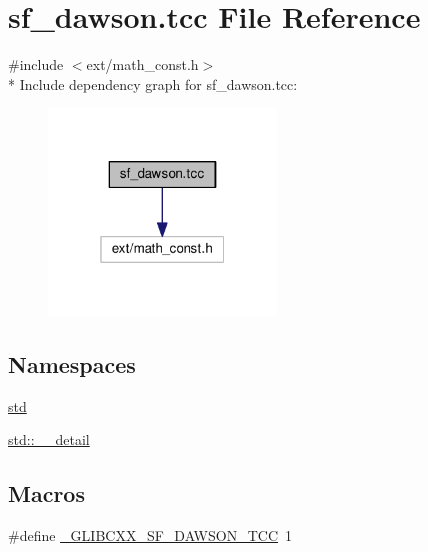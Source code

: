 \hypertarget{sf__dawson_8tcc}{}\section{sf\+\_\+dawson.\+tcc File Reference}
\label{sf__dawson_8tcc}
{\ttfamily \#include $<$ext/math\+\_\+const.\+h$>$}\\*
Include dependency graph for sf\+\_\+dawson.\+tcc\+:
\nopagebreak
\begin{figure}[H]
\begin{center}
\leavevmode
\includegraphics[width=172pt]{sf__dawson_8tcc__incl}
\end{center}
\end{figure}
\subsection*{Namespaces}
\begin{DoxyCompactItemize}
\item 
 \hyperlink{namespacestd}{std}
\item 
 \hyperlink{namespacestd_1_1____detail}{std\+::\+\_\+\+\_\+detail}
\end{DoxyCompactItemize}
\subsection*{Macros}
\begin{DoxyCompactItemize}
\item 
\#define \hyperlink{sf__dawson_8tcc_a72d0ce5cd51240da4fb2546e640923de}{\+\_\+\+G\+L\+I\+B\+C\+X\+X\+\_\+\+S\+F\+\_\+\+D\+A\+W\+S\+O\+N\+\_\+\+T\+C\+C}~1
\end{DoxyCompactItemize}
